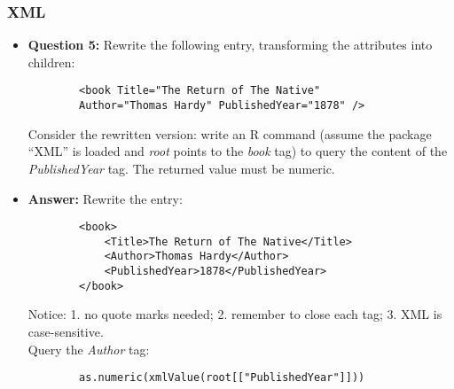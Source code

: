 \documentclass[9pt]{beamer}
\begin{document}
\begin{frame}[fragile]
	\frametitle{XML}
	\begin{itemize}
		\item {\bf Question 5:} Rewrite the following entry, transforming the attributes into children:
		\begin{verbatim}
		<book Title="The Return of The Native" 
		Author="Thomas Hardy" PublishedYear="1878" />
		\end{verbatim}
		Consider the rewritten version: write an R command (assume the package ``XML'' is loaded and \emph{root} points to the \emph{book} tag) to query the content of the \emph{PublishedYear} tag. The returned value must be numeric.
		\item {\bf Answer:} Rewrite the entry:
		\begin{verbatim}
		<book>
			<Title>The Return of The Native</Title>
			<Author>Thomas Hardy</Author>
			<PublishedYear>1878</PublishedYear>
		</book>
		\end{verbatim}
		Notice: 1. no quote marks needed; 2. remember to close each tag; 3. XML is case-sensitive.\\\bigskip
		Query the \emph{Author} tag:
		\begin{verbatim}
		as.numeric(xmlValue(root[["PublishedYear"]]))
		\end{verbatim}
	\end{itemize}
\end{frame}
\end{document}
